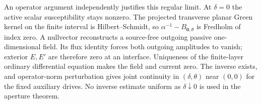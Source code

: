 \documentclass[11pt]{article}
\begin{document}
An operator argument independently justifies this regular limit. At $\delta=0$ the active scalar susceptibility stays nonzero. The projected transverse planar Green kernel on the finite interval is Hilbert--Schmidt, so $\alpha^{-1}-B_{\mathbf0,\theta}$ is Fredholm of index zero. A nullvector reconstructs a source-free outgoing passive one-dimensional field. Its flux identity forces both outgoing amplitudes to vanish; exterior $E,E'$ are therefore zero at an interface. Uniqueness of the finite-layer ordinary differential equation makes the field and current zero. The inverse exists, and operator-norm perturbation gives joint continuity in $(\delta,\theta)$ near $(0,0)$ for the fixed auxiliary drives. No inverse estimate uniform as $\delta\downarrow0$ is used in the aperture theorem.



\end{document}
